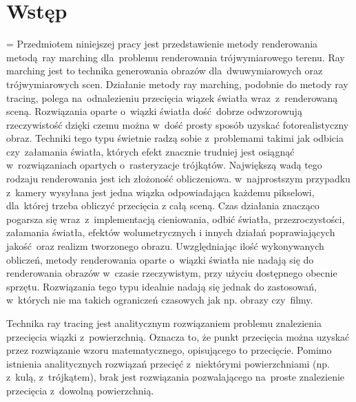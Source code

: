 \chapter{Wstęp}
\label{ch:wstep}
\emergencystretch=\maxdimen
Przedmiotem niniejszej pracy jest przedstawienie metody renderowania metodą ray marching dla~problemu renderowania trójwymiarowego terenu.
Ray marching jest to technika generowania obrazów dla~dwuwymiarowych oraz trójwymiarowych scen.
Działanie metody ray marching, podobnie do metody ray tracing, polega na~odnalezieniu przecięcia wiązek światła wraz~z~renderowaną sceną.
Rozwiązania oparte o~wiązki światła dość dobrze odwzorowują rzeczywistość dzięki czemu można w~dość prosty sposób uzyskać fotorealistyczny obraz.
Techniki tego typu świetnie radzą sobie z~problemami takimi jak odbicia czy~załamania światła, których efekt znacznie trudniej jest osiągnąć w~rozwiązaniach opartych o~rasteryzacje trójkątów.
Największą wadą tego rodzaju renderowania jest ich złożoność obliczeniowa. w~najprostszym przypadku z~kamery wysyłana jest jedna wiązka odpowiadająca każdemu pikselowi, dla~której trzeba obliczyć przecięcia z całą sceną.
Czas działania znacząco pogarsza się wraz~z~implementacją cieniowania, odbić światła, przezroczystości, załamania światła, efektów wolumetrycznych i innych działań poprawiających jakość oraz realizm tworzonego obrazu.
Uwzględniając ilość wykonywanych obliczeń, metody renderowania oparte o~wiązki światła nie nadają się do renderowania obrazów w~czasie rzeczywistym, przy użyciu dostępnego obecnie sprzętu.
Rozwiązania tego typu idealnie nadają się jednak do zastosowań, w~których nie ma takich ograniczeń czasowych jak np. obrazy czy~filmy.

Technika ray tracing jest analitycznym rozwiązaniem problemu znalezienia przecięcia wiązki z~powierzchnią.
Oznacza to, że punkt przecięcia można uzyskać przez rozwiązanie wzoru matematycznego, opisującego to przecięcie.
Pomimo istnienia analitycznych rozwiązań przecięć z~niektórymi powierzchniami (np. z~kulą, z~trójkątem), brak jest rozwiązania
pozwalającego na~proste znalezienie przecięcia z~dowolną powierzchnią.

